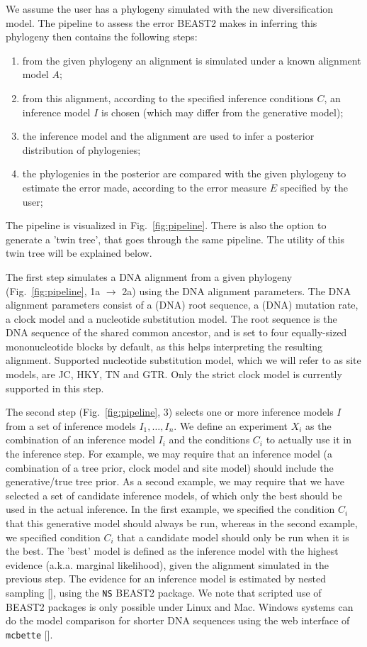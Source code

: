 We assume the user has a phylogeny simulated with the new diversification model. 
The pipeline to assess the error BEAST2 makes in inferring this phylogeny 
then contains the following steps:
\begin{enumerate}
  \item from the given phylogeny an alignment is simulated 
    under a known alignment model $\mathit{A}$;
  \item from this alignment, according to the specified 
    inference conditions $\mathit{C}$, 
    an inference model $\mathit{I}$ is chosen (which may differ from the 
    generative model);
  \item the inference model and the alignment are used 
    to infer a posterior distribution of phylogenies;
  \item the phylogenies in the posterior are compared with the given phylogeny 
    to estimate the error made, according to 
    the error measure $\mathit{E}$ specified by the user;
\end{enumerate}
The pipeline is visualized in Fig.~\ref{fig:pipeline}. 
There is also the option to generate a 'twin tree', 
that goes through the same pipeline. 
The utility of this twin tree will be explained below.

The first step simulates a DNA alignment from a given 
phylogeny (Fig.~\ref{fig:pipeline}, 1a $\rightarrow$ 2a)
using the DNA alignment parameters.
The DNA alignment parameters consist of 
a (DNA) root sequence, a (DNA) mutation rate, a clock model 
and a nucleotide substitution model.
The root sequence is the DNA sequence of the shared common ancestor,
and is set to four equally-sized mononucleotide blocks by default, as this
helps interpreting the resulting alignment.
Supported nucleotide substitution model, which
we will refer to as site models, 
are JC, HKY, TN and GTR. Only the strict
clock model is currently supported in this step.

The second step (Fig.~\ref{fig:pipeline}, 3)
selects one or more inference models $I$ from a set of inference 
models $I_{1},\dots,I_{n}$. 
We define an experiment $X_{i}$ as the combination of 
an inference model $I_{i}$ and the conditions $C_{i}$ 
to actually use it in the inference step.
For example, we may require that an inference
model (a combination of a tree prior, clock model and site model) 
should include the generative/true tree prior. 
As a second example, we may require that we have selected a set of 
candidate inference models,
of which only the best should be used in the actual inference.
In the first example, we specified the condition $C_{i}$ that this
generative model should always be run, whereas in the second example,
we specified condition $C_{i}$ that a candidate model should only be run
when it is the best.
The 'best' model is defined as the inference model with
the highest evidence (a.k.a. marginal likelihood), given the alignment 
simulated in the previous step.
The evidence for an inference model is estimated by nested 
sampling [\cite{maturana2018model}], using the \verb;NS; BEAST2 package. 
We note that scripted use of BEAST2 packages is only possible under Linux and Mac.
Windows systems can do the model comparison for shorter DNA sequences 
using the web interface of \verb;mcbette; [\cite{mcbette}].

